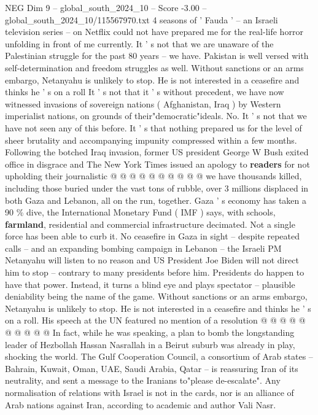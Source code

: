 \begin{textsample}{NEG Dim 9 – global\_south\_2024\_10 – Score -3.00 – global\_south\_2024\_10/115567970.txt}  \label{ex:f9_neg_366}
4 seasons of ' Fauda ' -- an Israeli television series -- on Netflix could not have prepared me for the real-life horror unfolding in front of me currently.
It ' s not that we are unaware of the Palestinian struggle for the past 80 years -- we have.
Pakistan is well versed with self-determination and freedom struggles as well.
Without sanctions or an arms embargo, Netanyahu is unlikely to stop.
He is not interested in a ceasefire and thinks he ' s on a roll It ' s not that it ' s without precedent, we have now witnessed invasions of sovereign nations ( Afghanistan, Iraq ) by Western imperialist nations, on grounds of their"democratic"ideals.
No.
It ' s not that we have not seen any of this before.
It ' s that nothing prepared us for the level of sheer brutality and accompanying impunity compressed within a few months.
Following the botched Iraq invasion, former US president George W Bush exited office in disgrace and The New York Times issued an apology to \textbf{readers} for not upholding their journalistic @ @ @ @ @ @ @ @ @ @ we have thousands killed, including those buried under the vast tons of rubble, over 3 millions displaced in both Gaza and Lebanon, all on the run, together.
Gaza ' s economy has taken a 90 \% dive, the International Monetary Fund ( IMF ) says, with schools, \textbf{farmland}, residential and commercial infrastructure decimated.
Not a single force has been able to curb it.
No ceasefire in Gaza in sight -- despite repeated calls -- and an expanding bombing campaign in Lebanon -- the Israeli PM Netanyahu will listen to no reason and US President Joe Biden will not direct him to stop -- contrary to many presidents before him.
Presidents do happen to have that power.
Instead, it turns a blind eye and plays spectator -- plausible deniability being the name of the game.
Without sanctions or an arms embargo, Netanyahu is unlikely to stop.
He is not interested in a ceasefire and thinks he ' s on a roll.
His speech at the UN featured no mention of a resolution @ @ @ @ @ @ @ @ @ @ In fact, while he was speaking, a plan to bomb the longstanding leader of Hezbollah Hassan Nasrallah in a Beirut suburb was already in play, shocking the world.
The Gulf Cooperation Council, a consortium of Arab states -- Bahrain, Kuwait, Oman, UAE, Saudi Arabia, Qatar -- is reassuring Iran of its neutrality, and sent a message to the Iranians to"please de-escalate".
Any normalisation of relations with Israel is not in the cards, nor is an alliance of Arab nations against Iran, according to academic and author Vali Nasr.

\end{textsample}
